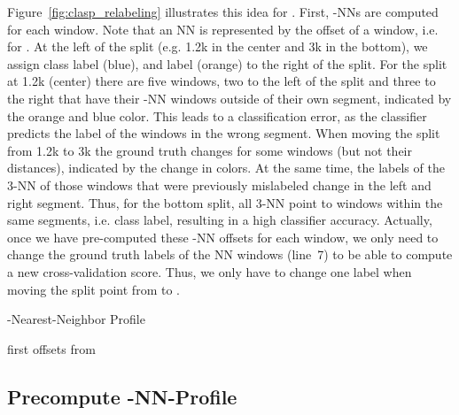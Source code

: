 \documentclass[pdflatex,sn-basic]{sn-jnl}
\begin{document}
Figure~\ref{fig:clasp_relabeling} illustrates this idea for . First, -NNs are computed for each window. Note that an NN is represented by the offset of a window, i.e.  for . At the left of the split (e.g. 1.2k in the center and 3k in the bottom), we assign class label  (blue), and label  (orange) to the right of the split. For the split at 1.2k (center) there are five windows, two to the left of the split and three to the right that have their -NN windows outside of their own segment, indicated by the orange and blue color. This leads to a classification error, as the classifier predicts the label of the windows in the wrong segment. When moving the split from 1.2k to 3k the ground truth  changes for some windows (but not their distances), indicated by the change in colors. At the same time, the labels of the 3-NN of those windows that were previously mislabeled change in the left and right segment. Thus, for the bottom split, all 3-NN point to windows within the same segments, i.e. class label, resulting in a high classifier accuracy. Actually, once we have pre-computed these -NN offsets for each window, we only need to change the ground truth labels of the NN windows (line~7) to be able to compute a new cross-validation score. Thus, we only have to change one label when moving the split point from  to . 

\begin{algorithm}[t]
	\caption{-Nearest-Neighbor Profile}\label{alg:k_nn_profile}
	\begin{algorithmic}[1]
		    \State 
			\State  
            \State  

			\For{}
				\State  {}
				\State  first  offsets from 
			\EndFor
			
			\State \Return{}
		\EndProcedure 
	\end{algorithmic}
\end{algorithm}


\subsection{Precompute -NN-Profile} \label{sec:k-nn}
\end{document}
